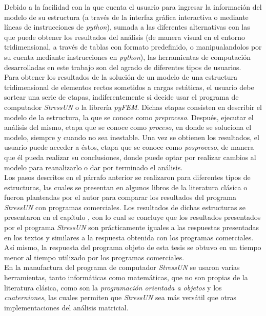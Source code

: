 Debido a la facilidad con la que cuenta el usuario para ingresar la información del modelo de su estructura (a través de la interfaz gráfica interactiva o mediante líneas de instrucciones de \textit{python}), sumada a las diferentes alternativas con las que puede obtener los resultados del análisis (de manera visual en el entorno tridimensional, a través de tablas con formato predefinido, o manipualandolos por su cuenta mediante instrucciones en \textit{python}), las herramientas de computación desarrolladas en este trabajo son del agrado de diferentes tipos de usuarios. \\

Para obtener los resultados de la solución de un modelo de una estructura tridimensional de elementos rectos sometidos a cargas estáticas, el usuario debe sortear una serie de etapas, indiferentemente si decide usar el programa de computador \textit{StressUN} o la librería \textit{pyFEM}. Dichas etapas consisten en describir el modelo de la estructura, la que se conoce como \textit{preproceso}. Después, ejecutar el análisis del mismo, etapa que se conoce como \textit{proceso}, en donde se soluciona el modelo, siempre y cuando no sea inestable. Una vez se obtienen los resultados, el usuario puede acceder a éstos, etapa que se conoce como \textit{posproceso}, de manera que él pueda realizar su conclusiones, donde puede optar por realizar cambios al modelo para reanalizarlo o dar por terminado el análisis. \\

Los pasos descritos en el párrafo anterior se realizaron para diferentes tipos de estructuras, las cuales se presentan en algunos libros de la literatura clásica o fueron planteadas por el autor para comparar los resultados del programa \textit{StressUN} con programas comerciales. Los resultados de dichas estructuras se presentaron en el capítulo \textit{}, con lo cual se concluye que los resultados presentados por el programa \textit{StressUN} son prácticamente iguales a las respuestas presentadas en los textos y similares a la respuesta obtenida con los programas comerciales. Así mismo, la respuesta del programa objeto de esta tesis se obtuvo en un tiempo menor al tiempo utilizado por los programas comerciales. \\

En la manufactura del programa de computador \textit{StressUN} se usaron varias herramientas, tanto informáticas como matemáticas, que no son propias de la literatura clásica, como son la \textit{programación orientada a objetos} y los \textit{cuaterniones}, las cuales permiten que \textit{StressUN} sea más versátil que otras implementaciones del análisis matricial. \\


